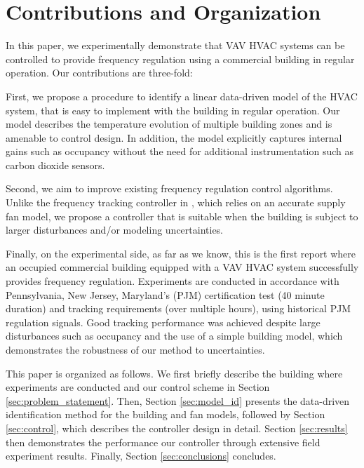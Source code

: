 \documentclass[../thesis.tex]{subfiles}
\begin{document}
\section{Contributions and Organization}

In this paper, we experimentally demonstrate that VAV HVAC systems can be controlled to provide frequency regulation using a commercial building in regular operation.
Our contributions are three-fold:

First, we propose a procedure to identify a linear data-driven model of the HVAC system, that is easy to implement with the building in regular operation. 
Our model describes the temperature evolution of multiple building zones and is amenable to control design.
In addition, the model explicitly captures internal gains such as occupancy without the need for additional instrumentation such as carbon dioxide sensors.

Second, we aim to improve existing frequency regulation control algorithms.
Unlike the frequency tracking controller in \cite{Vrettos:2016flexlab1}, which relies on an accurate supply fan model, we propose a controller that is suitable when the building is subject to larger disturbances and/or modeling uncertainties. 

Finally, on the experimental side, as far as we know, this is the first report where an occupied commercial building equipped with a VAV HVAC system successfully provides frequency regulation.
Experiments are conducted in accordance with Pennsylvania, New Jersey, Maryland's (PJM) certification test (40 minute duration) and tracking requirements (over multiple hours), using historical PJM regulation signals.  
Good tracking performance was achieved despite large disturbances such as occupancy and the use of a simple building model, which demonstrates the robustness of our method to uncertainties.

This paper is organized as follows. We first briefly describe the building where experiments are conducted and our control scheme in Section \ref{sec:problem_statement}. Then, Section \ref{sec:model_id} presents the data-driven identification method for the building and fan models, followed by Section \ref{sec:control}, which describes the controller design in detail. Section \ref{sec:results} then demonstrates the performance our controller through extensive field experiment results.
Finally, Section \ref{sec:conclusions} concludes.
\end{document}
